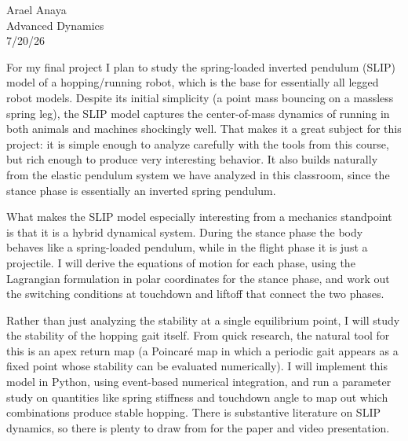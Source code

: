 \documentclass[11pt]{article}
\newcommand{\Name}{Arael Anaya}
\newcommand{\course}{Advanced Dynamics}
\newcommand{\SubDate}{7/20/26}
\begin{document}
\begin{flushright}
    \Name \\
    \course \\
    \SubDate
\end{flushright}

\vspace{0.5em}

For my final project I plan to study the spring-loaded inverted pendulum
(SLIP) model of a hopping/running robot, which is the base for essentially
all legged robot models. Despite its initial simplicity (a point mass
bouncing on a massless spring leg), the SLIP model captures the
center-of-mass dynamics of running in both animals and machines shockingly
well. That makes it a great subject for this project: it is simple enough to
analyze carefully with the tools from this course, but rich enough to
produce very interesting behavior. It also builds naturally from the
elastic pendulum system we have analyzed in this classroom, since the
stance phase is essentially an inverted spring pendulum.

What makes the SLIP model especially interesting from a mechanics
standpoint is that it is a hybrid dynamical system. During the stance phase
the body behaves like a spring-loaded pendulum, while in the flight phase
it is just a projectile. I will derive the equations of motion for each
phase, using the Lagrangian formulation in polar coordinates for the stance
phase, and work out the switching conditions at touchdown and liftoff that
connect the two phases.

Rather than just analyzing the stability at a single equilibrium point, I
will study the stability of the hopping gait itself. From quick research,
the natural tool for this is an apex return map (a Poincar\'e map in which
a periodic gait appears as a fixed point whose stability can be evaluated
numerically). I will implement this model in Python, using event-based
numerical integration, and run a parameter study on quantities like spring
stiffness and touchdown angle to map out which combinations produce stable
hopping. There is substantive literature on SLIP dynamics, so there is
plenty to draw from for the paper and video presentation.
\end{document}
